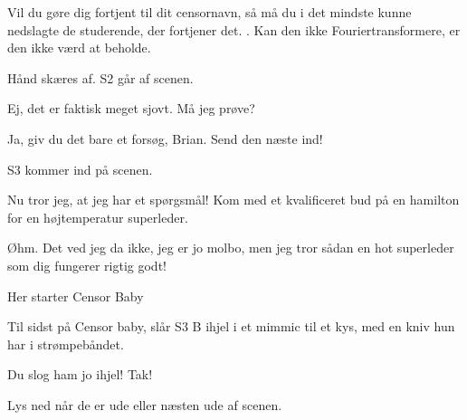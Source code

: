 \documentclass[a4paper,11pt]{article}
\begin{document}
\begin{sketch}
 Vil du gøre dig fortjent til dit censornavn, så må du i det mindste kunne nedslagte de studerende, der fortjener det. . Kan den ikke Fouriertransformere, er den ikke værd at beholde.

\scene Hånd skæres af. S2 går af scenen.

 Ej, det er faktisk meget sjovt. Må jeg prøve?

 Ja, giv du det bare et forsøg, Brian. Send den næste ind!

S3 kommer ind på scenen.

 Nu tror jeg, at jeg har et spørgsmål! Kom med et kvalificeret bud på en hamilton for en højtemperatur superleder.

 Øhm. Det ved jeg da ikke, jeg er jo molbo, men jeg tror sådan en hot superleder som dig fungerer rigtig godt! 

\scene Her starter Censor Baby









\scene Til sidst på Censor baby, slår S3 B ihjel i et mimmic til et kys, med en kniv hun har i strømpebåndet.

Du slog ham jo ihjel! Tak!


\scene Lys ned når de er ude eller næsten ude af scenen.



\end{sketch}
\end{document}
